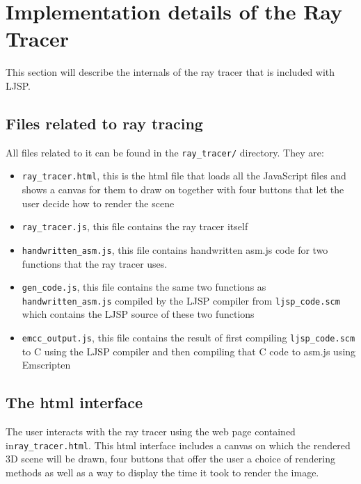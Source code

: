 \documentclass[11pt]{report}
\begin{document}

\section{Implementation details of the Ray Tracer}
This section will describe the internals of the ray tracer that is included with LJSP.
\subsection{Files related to ray tracing}
All files related to it can be found in the \texttt{ray_tracer/} directory. They are:
\begin{itemize}
\item \texttt{ray_tracer.html}, this is the html file that loads all the JavaScript files and shows a canvas for them to draw on together with four buttons that let the user decide how to render the scene
\item \texttt{ray_tracer.js}, this file contains the ray tracer itself
\item \texttt{handwritten_asm.js}, this file contains handwritten asm.js code for two functions that the ray tracer uses.
\item \texttt{gen_code.js}, this file contains the same two functions as \texttt{handwritten_asm.js} compiled by the LJSP compiler from \texttt{ljsp_code.scm} which contains the LJSP source of these two functions
\item \texttt{emcc_output.js}, this file contains the result of first compiling \texttt{ljsp_code.scm} to C using the LJSP compiler and then compiling that C code to asm.js using Emscripten
\end{itemize}


\subsection{The html interface}
The user interacts with the ray tracer using the web page contained in\texttt{ray_tracer.html}. This html interface includes a canvas on which the rendered 3D scene will be drawn, four buttons that offer the user a choice of rendering methods as well as a way to display the time it took to render the image. %
\end{document}
